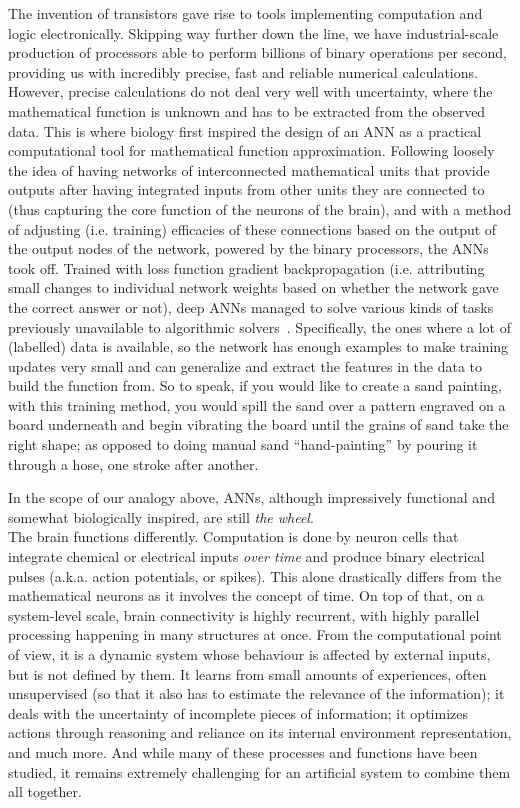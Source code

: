 The invention of transistors gave rise to tools implementing computation and logic electronically. Skipping way further down the line, we have industrial-scale production of processors able to perform billions of binary operations per second, providing us with incredibly precise, fast and reliable numerical calculations. However, precise calculations do not deal very well with uncertainty, where the mathematical function is unknown and has to be extracted from the observed data. This is where biology first inspired the design of an \ac{ANN} as a practical computational tool for mathematical function approximation. Following loosely the idea of having networks of interconnected mathematical units that provide outputs after having integrated inputs from other units they are connected to (thus capturing the core function of the neurons of the brain), and with a method of adjusting (i.e. training) efficacies of these connections based on the output of the output nodes of the network, powered by the binary processors, the \ac{ANN}s took off. Trained with loss function gradient backpropagation (i.e. attributing small changes to individual network weights based on whether the network gave the correct answer or not), deep ANNs managed to solve various kinds of tasks previously unavailable to algorithmic solvers~\cite{Sejnowski20}. Specifically, the ones where a lot of (labelled) data is available, so the network has enough examples to make training updates very small and can generalize and extract the features in the data to build the function from. So to speak, if you would like to create a sand painting, with this training method, you would spill the sand over a pattern engraved on a board underneath and begin vibrating the board until the grains of sand take the right shape; as opposed to doing manual sand ``hand-painting'' by pouring it through a hose, one stroke after another.

In the scope of our analogy above, ANNs, although impressively functional and somewhat biologically inspired, are still \emph{the wheel}.\\

The brain functions differently. Computation is done by neuron cells that integrate chemical or electrical inputs \emph{over time} and produce binary electrical pulses (a.k.a. action potentials, or spikes). This alone drastically differs from the mathematical neurons as it involves the concept of time. On top of that, on a system-level scale, brain connectivity is highly recurrent, with highly parallel processing happening in many structures at once. From the computational point of view, it is a dynamic system whose behaviour is affected by external inputs, but is not defined by them. It learns from small amounts of experiences, often unsupervised (so that it also has to estimate the relevance of the information); it deals with the uncertainty of incomplete pieces of information; it optimizes actions through reasoning and reliance on its internal environment representation, and much more. And while many of these processes and functions have been studied, it remains extremely challenging for an artificial system to combine them all together.%

